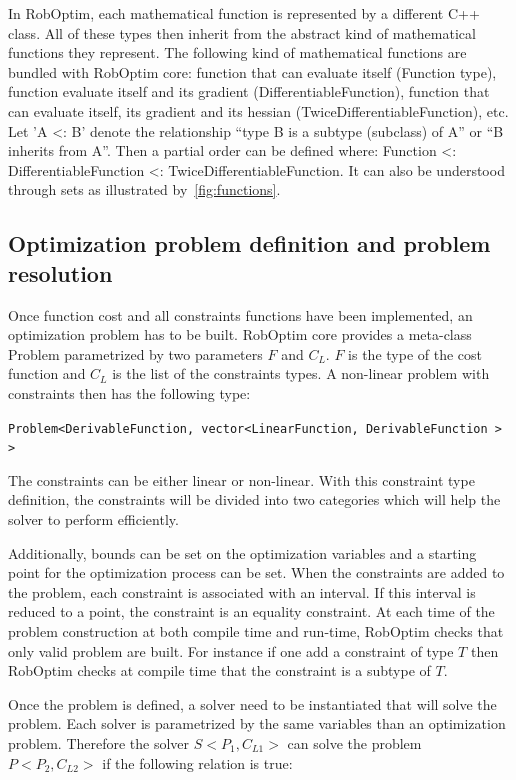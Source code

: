 \documentclass[conference,final,a4paper,twocolumn,9pt]{IEEEtran}
\begin{document}
In RobOptim, each mathematical function is represented by a different
C++ class. All of these types then inherit from the abstract kind of
mathematical functions they represent. The following kind of
mathematical functions are bundled with RobOptim core: function that
can evaluate itself (Function type), function evaluate itself and its
gradient (DifferentiableFunction), function that can evaluate itself,
its gradient and its hessian (TwiceDifferentiableFunction), etc.  Let
'A <: B' denote the relationship ``type B is a subtype (subclass) of
A'' or ``B inherits from A''. Then a partial order can be defined
where: Function <: DifferentiableFunction <:
TwiceDifferentiableFunction. It can also be understood through sets
as illustrated by~\autoref{fig:functions}.


\subsection{Optimization problem definition and problem resolution}


Once function cost and all constraints functions have been
implemented, an optimization problem has to be built. RobOptim core
provides a meta-class Problem parametrized by two parameters $F$ and
$C_L$. $F$ is the type of the cost function and $C_L$ is the list of
the constraints types. A non-linear problem with constraints then has
the following type:


\texttt{Problem<DerivableFunction, vector<LinearFunction, DerivableFunction > >}


The constraints can be either linear or non-linear. With this
constraint type definition, the constraints will be divided into two
categories which will help the solver to perform efficiently.

Additionally, bounds can be set on the optimization variables and a
starting point for the optimization process can be set. When the
constraints are added to the problem, each constraint is associated
with an interval. If this interval is reduced to a point, the
constraint is an equality constraint. At each time of the problem
construction at both compile time and run-time, RobOptim checks that
only valid problem are built. For instance if one add a constraint of
type $T$ then RobOptim checks at compile time that the constraint is a
subtype of $T$.


Once the problem is defined, a solver need to be instantiated that
will solve the problem. Each solver is parametrized by the same
variables than an optimization problem. Therefore the solver
$S<P_1,C_{L1}>$ can solve the problem $P<P_2,C_{L2}>$ if the following
relation is true:
\end{document}
